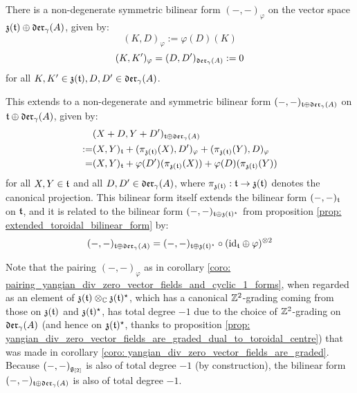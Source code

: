         \begin{corollary} \label{coro: pairing_yangian_div_zero_vector_fields_and_cyclic_1_forms}
            There is a non-degenerate symmetric bilinear form $(-, -)_{\varphi}$ on the vector space $\mathfrak{z}(\mathfrak{t}) \oplus \mathfrak{der}_{\gamma}(A)$, given by:
                $$(K, D)_{\varphi} := \varphi(D)(K)$$
                $$(K, K')_{\varphi} = (D, D')_{\mathfrak{der}_{\gamma}(A)} := 0$$
            for all $K, K' \in \mathfrak{z}(\mathfrak{t}), D, D' \in \mathfrak{der}_{\gamma}(A)$.

            This extends to a non-degenerate and symmetric bilinear form $(-, -)_{\mathfrak{t} \oplus \mathfrak{der}_{\gamma}(A)}$ on $\mathfrak{t} \oplus \mathfrak{der}_{\gamma}(A)$, given by:
                $$
                    \begin{aligned}
                        & ( X + D, Y + D' )_{\mathfrak{t} \oplus \mathfrak{der}_{\gamma}(A)}
                        \\
                        := & (X, Y)_{\mathfrak{t}} + ( \pi_{\mathfrak{z}(\mathfrak{t})}(X), D' )_{\varphi} + ( \pi_{\mathfrak{z}(\mathfrak{t})}(Y), D )_{\varphi}
                        \\
                        = & (X, Y)_{\mathfrak{t}} + \varphi(D')( \pi_{\mathfrak{z}(\mathfrak{t})}(X) ) + \varphi(D)( \pi_{\mathfrak{z}(\mathfrak{t})}(Y) )
                    \end{aligned}
                $$
            for all $X, Y \in \mathfrak{t}$ and all $D, D' \in \mathfrak{der}_{\gamma}(A)$, where $\pi_{\mathfrak{z}(\mathfrak{t})}: \mathfrak{t} \to \mathfrak{z}(\mathfrak{t})$ denotes the canonical projection. This bilinear form itself extends the bilinear form $(-, -)_{\mathfrak{t}}$ on $\mathfrak{t}$, and it is related to the bilinear form $(-, -)_{\mathfrak{t} \oplus \mathfrak{z}(\mathfrak{t})^{\star}}$ from proposition \ref{prop: extended_toroidal_bilinear_form} by:
                $$(-, -)_{\toroidal \oplus \divzero} = (-, -)_{\toroidal \oplus \z(\toroidal)^{\star}} \circ ( \id_{\toroidal} \oplus \varphi )^{\tensor 2}$$
        \end{corollary}
        \begin{remark}
            Note that the pairing $(-, -)_{\varphi}$ as in corollary \ref{coro: pairing_yangian_div_zero_vector_fields_and_cyclic_1_forms}, when regarded as an element of $\z(\toroidal) \tensor_{\bbC} \z(\toroidal)^{\star}$, which has a canonical $\mathbb{Z}^2$-grading coming from those on $\mathfrak{z}(\mathfrak{t})$ and $\mathfrak{z}(\mathfrak{t})^{\star}$, has total degree $-1$ due to the choice of $\mathbb{Z}^2$-grading on $\mathfrak{der}_{\gamma}(A)$ (and hence on $\mathfrak{z}(\mathfrak{t})^{\star}$, thanks to proposition \ref{prop: yangian_div_zero_vector_fields_are_graded_dual_to_toroidal_centre}) that was made in corollary \ref{coro: yangian_div_zero_vector_fields_are_graded}. Because $(-, -)_{\mathfrak{g}_{[2]}}$ is also of total degree $-1$ (by construction), the bilinear form $(-, -)_{\mathfrak{t} \oplus \mathfrak{der}_{\gamma}(A)}$ is also of total degree $-1$.
        \end{remark}

